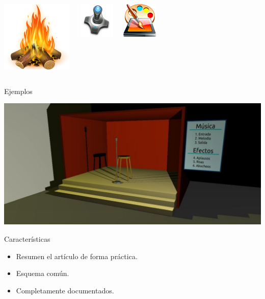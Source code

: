 \documentclass[green]{beamer}
\begin{document}
\begin{frame}
\begin{columns}[c]
    \column{60pt}
	
	\begin{center}
	    \includegraphics[scale=0.45]{img/particulas.png}
	\end{center}
	
	\begin{center}
	    \includegraphics[scale=0.5]{img/joystick.png}
	\end{center}
	
	\begin{center}
	    \includegraphics[scale=0.5]{img/pintura.png}
	\end{center}
	
    \end{columns} 
\end{frame}
    
    

\begin{frame}{Ejemplos}
    
    \begin{center}
	\includegraphics[scale=0.22]{img/ejemplo-audio.jpg}
    \end{center}
    
    \begin{block}{Características}
	\begin{itemize}
	    \item Resumen el artículo de forma práctica.
	    \item Esquema común.
	    \item Completamente documentados.
	\end{itemize}
    \end{block}
    
\end{frame}
\end{document}
